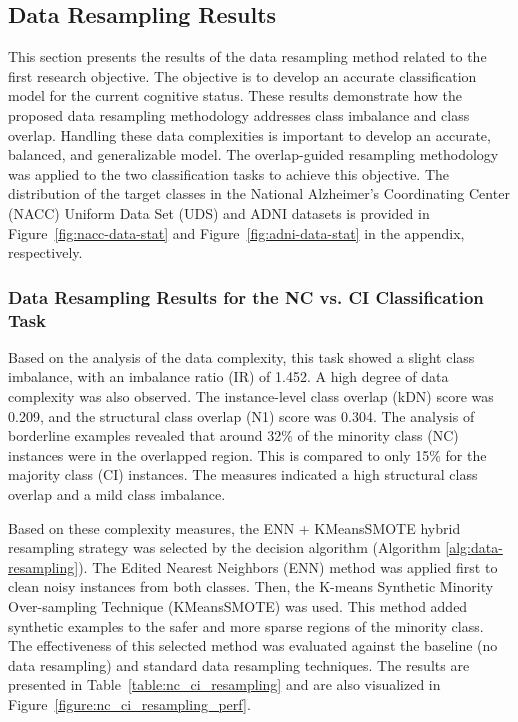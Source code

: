 \subsection{Data Resampling Results}
\label{sec:resampling_results}
This section presents the results of the data resampling method related to the first research objective. The objective is to develop an accurate classification model for the current cognitive status. These results demonstrate how the proposed data resampling methodology addresses class imbalance and class overlap. Handling these data complexities is important to develop an accurate, balanced, and generalizable model. The overlap-guided resampling methodology was applied to the two classification tasks to achieve this objective. The distribution of the target classes in the National Alzheimer's Coordinating Center (\acrshort{NACC}) Uniform Data Set (\acrshort{UDS}) and ADNI datasets is provided in Figure~\ref{fig:nacc-data-stat} and Figure~\ref{fig:adni-data-stat} in the appendix, respectively.

\subsubsection{Data Resampling Results for the NC vs. CI Classification Task}
\label{sec:resampling_nc_ci}
Based on the analysis of the data complexity, this task showed a slight class imbalance, with an imbalance ratio (\acrshort{IR}) of 1.452. A high degree of data complexity was also observed. The instance-level class overlap (\acrshort{kDN}) score was 0.209, and the structural class overlap (\acrshort{N1}) score was 0.304. The analysis of borderline examples revealed that around 32\% of the minority class (NC) instances were in the overlapped region. This is compared to only 15\% for the majority class (CI) instances. The measures indicated a high structural class overlap and a mild class imbalance. 

Based on these complexity measures, the ENN + \acrshort{KMeansSMOTE} hybrid resampling strategy was selected by the decision algorithm (Algorithm \ref{alg:data-resampling}). The Edited Nearest Neighbors (\acrshort{ENN}) method was applied first to clean noisy instances from both classes. Then, the K-means Synthetic Minority Over-sampling Technique (\acrshort{KMeansSMOTE}) was used. This method added synthetic examples to the safer and more sparse regions of the minority class. The effectiveness of this selected method was evaluated against the baseline (no data resampling) and standard data resampling techniques. The results are presented in Table~\ref{table:nc_ci_resampling} and are also visualized in Figure~\ref{figure:nc_ci_resampling_perf}.

